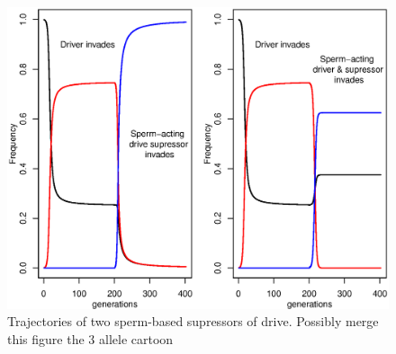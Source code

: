 \documentclass[12pt,letterpaper]{article}
\begin{document}
\begin{figure}
\includegraphics[width = 0.8 \textwidth]{Figures/trajectories_of_sperm_based_supressors.eps} 
\caption{Trajectories of two sperm-based supressors of drive. Possibly
merge this figure the 3 allele cartoon}  \label{Trajectories_of_supressors}
\end{figure}
\end{document}
